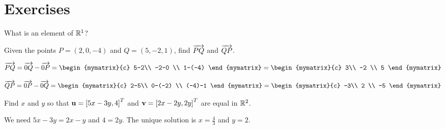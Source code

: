 \section*{Exercises}

\begin{enumialphparenastyle}

\begin{ex}
  What is an element of $\mathbb{R}^1$? 
\end{ex}

\begin{ex} Given the points $P=(2,0,-4)$ and $Q=(5,-2,1)$, find $\overrightarrow{PQ}$ and $\overrightarrow{QP}$.
 
\begin{sol}

\begin{equation*}
\longvect{PQ}  = \longvect{0Q} - \longvect{0P}= \begin{mymatrix}{c}
5-2\\
 -2-0 \\
1-(-4)
\end{mymatrix} = \begin{mymatrix}{c}
3\\
 -2 \\
5
\end{mymatrix}
\end{equation*}

\begin{equation*}
\longvect{QP}  = \longvect{0P} - \longvect{0Q}= \begin{mymatrix}{c}
2-5\\
 0-(-2) \\
(-4)-1
\end{mymatrix} = \begin{mymatrix}{c}
-3\\
 2 \\
-5
\end{mymatrix}
\end{equation*}

\end{sol}
\end{ex}

\begin{ex} Find $x$ and $y$ so that ${\bf u}= \left[5x-3y, 4\right]^T$ and
  ${\bf v}=\left[2x-2y, 2y\right]^T$ are equal in $\mathbb{R}^2$.
 
\begin{sol}
We need $5x-3y=2x-y$ and $4=2y$. The unique solution is
$x=\frac{4}{3}$ and $y=2$. 
\end{sol}
\end{ex}


\end{enumialphparenastyle}
